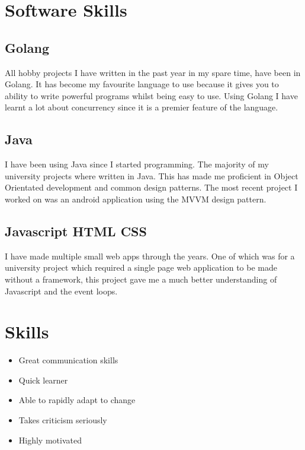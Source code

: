 \documentclass[a4paper]{cv}
\begin{document}
\begin{minipage}[t]{0.26\textwidth}

\section{Software Skills}
\subsection{Golang}
\begin{flushleft}
All hobby projects I have written in the past year in my spare time, have been in Golang. It has become my favourite language to use because it gives you to ability to write powerful programs whilst being easy to use. Using Golang I have learnt a lot about concurrency since it is a premier feature of the language.
\end{flushleft}
\sectionspace

\subsection{Java}
\begin{flushleft}
I have been using Java since I started programming. The majority of my university projects where written in Java. This has made me proficient in Object Orientated development and common design patterns. The most recent project I worked on was an android application using the MVVM design pattern.
\end{flushleft}

\sectionspace
\subsection{Javascript \textbullet{} HTML \textbullet{} CSS}
\begin{flushleft}
I have made multiple small web apps through the years. One of which was for a university project which required a single page web application to be made without a framework, this project gave me a much better understanding of Javascript and the event loops.
\end{flushleft}
\section{Skills}
\begin{flushleft}
\begin{itemize}
    \item Great communication skills
    \item Quick learner
    \item Able to rapidly adapt to change
    \item Takes criticism seriously
    \item Highly motivated
\end{itemize}
\end{flushleft}
\end{minipage}
\end{document}
